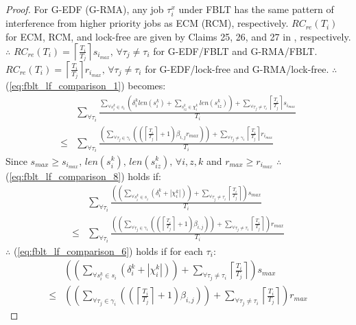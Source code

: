 \documentclass[prodmode,acmtecs]{acmsmall}
\begin{document}
\begin{compactenum}
\begin{proof}
For G-EDF (G-RMA),
any job $\tau_{i}^{x}$ under FBLT has the same pattern of interference
from higher priority jobs as ECM (RCM), respectively. $RC_{re}(T_{i})$
for ECM, RCM, and lock-free are given by Claims 25, 26, and 27 in \cite{shambake_phd_proposal}, 
respectively. $\therefore$ $RC_{re}(T_{i})=\left\lceil \frac{T_{i}}{T_{j}}\right\rceil s_{i_{max}},\,\forall\tau_{j}\neq\tau_{i}$ for G-EDF/FBLT and G-RMA/FBLT. $RC_{re}(T_{i})=\left\lceil \frac{T_{i}}{T_{j}}\right\rceil r_{i_{max}},\,\forall\tau_{j}\neq\tau_{i}$ for G-EDF/lock-free and G-RMA/lock-free. 
$\therefore$ (\ref{eq:fblt_lf_comparison_1}) becomes:
\begin{eqnarray}
 & \sum_{\forall\tau_{i}}\frac{\sum_{\forall s_{i}^{k}\in s_{i}}\left(\delta_{i}^{k}len(s_{i}^{k})+\sum_{s_{iz}^{k}\in\chi_{i}^{k}}len(s_{iz}^{k})\right)+\sum_{\forall\tau_{j}\neq\tau_{i}}\left\lceil \frac{T_{i}}{T_{j}}\right\rceil s_{i_{max}}}{T_{i}}\label{eq:fblt_lf_comparison_8}\\
\le & \sum_{\forall\tau_{i}}\frac{\left(\sum_{\forall\tau_{j}\in\gamma_{i}}\left(\left(\left\lceil \frac{T_{i}}{T_{j}}\right\rceil +1\right)\beta_{i,j}r_{max}\right)\right)+\sum_{\forall\tau_{j}\neq\gamma_{i}}\left\lceil \frac{T_{i}}{T_{j}}\right\rceil r_{i_{max}}}{T_{i}}\nonumber 
\end{eqnarray}
Since $s_{max}\ge s_{i_{max}},\, len(s_{i}^{k}),\, len(s_{iz}^{k}),\,\forall i,z,k$
and $r_{max}\ge r_{i_{max}}$ $\therefore$ (\ref{eq:fblt_lf_comparison_8})
holds if: 
\begin{eqnarray}
 & \sum_{\forall\tau_{i}}\frac{\left(\left(\sum_{\forall s_{i}^{k}\in s_{i}}\left(\delta_{i}^{k}+|\chi_{i}^{k}|\right)\right)+\sum_{\forall\tau_{j}\neq\tau_{i}}\left\lceil \frac{T_{i}}{T_{j}}\right\rceil \right)s_{max}}{T_{i}}\label{eq:fblt_lf_comparison_6}\\
\le & \sum_{\forall\tau_{i}}\frac{\left(\left(\sum_{\forall\tau_{j}\in\gamma_{i}}\left(\left(\left\lceil \frac{T_{i}}{T_{j}}\right\rceil +1\right)\beta_{i,j}\right)\right)+\sum_{\forall\tau_{j}\neq\tau_{i}}\left\lceil \frac{T_{i}}{T_{j}}\right\rceil \right)r_{max}}{T_{i}}\nonumber 
\end{eqnarray}
$\therefore$ (\ref{eq:fblt_lf_comparison_6}) holds if for each $\tau_{i}$:
\begin{eqnarray}
 & \left(\left(\sum_{\forall s_{i}^{k}\in s_{i}}\left(\delta_{i}^{k}+|\chi_{i}^{k}|\right)\right)+\sum_{\forall\tau_{j}\neq\tau_{i}}\left\lceil \frac{T_{i}}{T_{j}}\right\rceil \right)s_{max}\label{eq:fblt_lf_comparison_7}\\
\le & \left(\left(\sum_{\forall\tau_{j}\in\gamma_{i}}\left(\left(\left\lceil \frac{T_{i}}{T_{j}}\right\rceil +1\right)\beta_{i,j}\right)\right)+\sum_{\forall\tau_{j}\neq\tau_{i}}\left\lceil \frac{T_{i}}{T_{j}}\right\rceil \right)r_{max}\nonumber 

\end{eqnarray}
\end{proof}
\end{compactenum}
\end{document}
